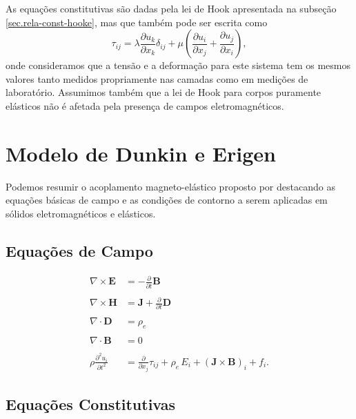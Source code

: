 As equa\c{c}\~oes constitutivas s\~ao dadas pela lei de Hook apresentada na subse\c{c}\~ao \ref{sec.rela-const-hooke}, mas que tamb\'em pode ser escrita como
\begin{equation}
\tau_{ij}=\lambda\frac{\partial u_k}{\partial x_k}\delta_{ij}+\mu\left(\frac{\partial u_i}{\partial x_j}+\frac{\partial u_j}{\partial x_i}\right),
\end{equation}
onde consideramos que a tens\~ao e a deforma\c{c}\~ao para  este sistema tem os mesmos valores tanto medidos propriamente nas camadas como em medi\c{c}\~oes de laborat\'orio. Assumimos tamb\'em que a lei de Hook para corpos puramente el\'asticos n\~ao \'e afetada pela presen\c{c}a de campos eletromagn\'eticos. 


\section{Modelo de Dunkin e Erigen}\label{sec.model_dun_erin}

Podemos resumir o acoplamento magneto-el\'astico proposto por \cite{eringen_1963} destacando as equa\c{c}\~oes b\'asicas de campo e as condi\c{c}\~oes de contorno a serem aplicadas em s\'olidos eletromagn\'eticos e el\'asticos.

\subsection{Equa\c{c}\~oes de Campo}

\begin{align}\label{eq.campo_dunkin_1}
\nabla\times\mathbf{E}&=-\frac{\partial}{\partial t}\mathbf{B}\\\nonumber\\\label{eq.campo_dunkin_2}
\nabla\times\mathbf{H}&=\mathbf{J}+\frac{\partial}{\partial t}\mathbf{D}\\\nonumber\\\label{eq.campo_dunkin_3}
\nabla\cdot\mathbf{D}&=\rho_e\\\nonumber\\\label{eq.campo_dunkin_4}
\nabla\cdot\mathbf{B}&=0\\\nonumber\\\label{eq.campo_dunkin_5}
\rho\frac{\partial^2 u_i}{\partial t^2}&=\frac{\partial}{\partial x_j}\tau_{ij}+\rho_e\,E_i+(\mathbf{J}\times\mathbf{B})_i+f_i.
\end{align}

\subsection{Equa\c{c}\~oes Constitutivas}\label{sec.constitutivas_dunkin}

